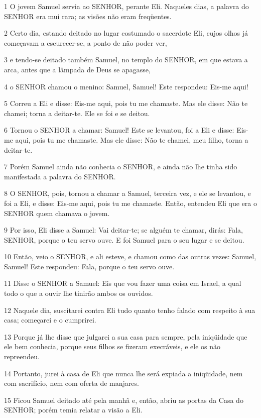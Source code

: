 \par 1 O jovem Samuel servia ao SENHOR, perante Eli. Naqueles dias, a palavra do SENHOR era mui rara; as visões não eram freqüentes.
\par 2 Certo dia, estando deitado no lugar costumado o sacerdote Eli, cujos olhos já começavam a escurecer-se, a ponto de não poder ver,
\par 3 e tendo-se deitado também Samuel, no templo do SENHOR, em que estava a arca, antes que a lâmpada de Deus se apagasse,
\par 4 o SENHOR chamou o menino: Samuel, Samuel! Este respondeu: Eis-me aqui!
\par 5 Correu a Eli e disse: Eis-me aqui, pois tu me chamaste. Mas ele disse: Não te chamei; torna a deitar-te. Ele se foi e se deitou.
\par 6 Tornou o SENHOR a chamar: Samuel! Este se levantou, foi a Eli e disse: Eis-me aqui, pois tu me chamaste. Mas ele disse: Não te chamei, meu filho, torna a deitar-te.
\par 7 Porém Samuel ainda não conhecia o SENHOR, e ainda não lhe tinha sido manifestada a palavra do SENHOR.
\par 8 O SENHOR, pois, tornou a chamar a Samuel, terceira vez, e ele se levantou, e foi a Eli, e disse: Eis-me aqui, pois tu me chamaste. Então, entendeu Eli que era o SENHOR quem chamava o jovem.
\par 9 Por isso, Eli disse a Samuel: Vai deitar-te; se alguém te chamar, dirás: Fala, SENHOR, porque o teu servo ouve. E foi Samuel para o seu lugar e se deitou.
\par 10 Então, veio o SENHOR, e ali esteve, e chamou como das outras vezes: Samuel, Samuel! Este respondeu: Fala, porque o teu servo ouve.
\par 11 Disse o SENHOR a Samuel: Eis que vou fazer uma coisa em Israel, a qual todo o que a ouvir lhe tinirão ambos os ouvidos.
\par 12 Naquele dia, suscitarei contra Eli tudo quanto tenho falado com respeito à sua casa; começarei e o cumprirei.
\par 13 Porque já lhe disse que julgarei a sua casa para sempre, pela iniqüidade que ele bem conhecia, porque seus filhos se fizeram execráveis, e ele os não repreendeu.
\par 14 Portanto, jurei à casa de Eli que nunca lhe será expiada a iniqüidade, nem com sacrifício, nem com oferta de manjares.
\par 15 Ficou Samuel deitado até pela manhã e, então, abriu as portas da Casa do SENHOR; porém temia relatar a visão a Eli.
